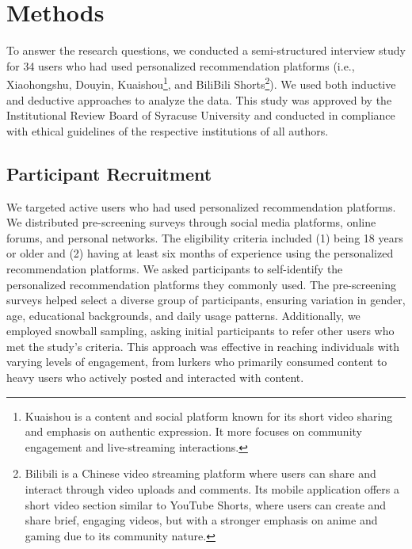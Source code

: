 \section{Methods}
To answer the research questions, we conducted a semi-structured interview study for 34 users who had used personalized recommendation platforms (i.e., Xiaohongshu, Douyin, Kuaishou\footnote{Kuaishou is a content and social platform known for its short video sharing and emphasis on authentic expression. It more focuses on community engagement and live-streaming interactions.}, and BiliBili Shorts\footnote{Bilibili is a Chinese video streaming platform where users can share and interact through video uploads and comments. Its mobile application offers a short video section similar to YouTube Shorts, where users can create and share brief, engaging videos, but with a stronger emphasis on anime and gaming due to its community nature.}). We used both inductive and deductive approaches to analyze the data. This study was approved by the Institutional Review Board of Syracuse University and conducted in compliance with ethical guidelines of the respective institutions of all authors.  

\subsection{Participant Recruitment}
We targeted active users who had used personalized recommendation platforms. We distributed pre-screening surveys through social media platforms, online forums, and personal networks. The eligibility criteria included (1) being 18 years or older and (2) having at least six months of experience using the personalized recommendation platforms. We asked participants to self-identify the personalized recommendation platforms they commonly used. The pre-screening surveys helped select a diverse group of participants, ensuring variation in gender, age, educational backgrounds, and daily usage patterns. Additionally, we employed snowball sampling, asking initial participants to refer other users who met the study's criteria. This approach was effective in reaching individuals with varying levels of engagement, from lurkers who primarily consumed content to heavy users who actively posted and interacted with content.

